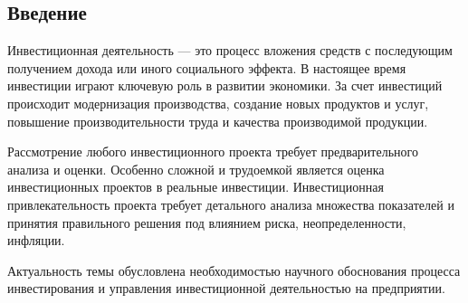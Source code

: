 \subsection*{Введение}

Инвестиционная деятельность --- это процесс вложения средств с последующим получением дохода или иного социального эффекта. В настоящее время инвестиции играют ключевую роль в развитии экономики. За счет инвестиций происходит модернизация производства, создание новых продуктов и услуг, повышение производительности труда и качества производимой продукции.

Рассмотрение любого инвестиционного проекта требует предварительного анализа и оценки. Особенно сложной и трудоемкой является оценка инвестиционных проектов в реальные инвестиции. Инвестиционная привлекательность проекта требует детального анализа множества показателей и принятия правильного решения под влиянием риска, неопределенности, инфляции.

Актуальность темы обусловлена необходимостью научного обоснования процесса инвестирования и управления инвестиционной деятельностью на предприятии.








